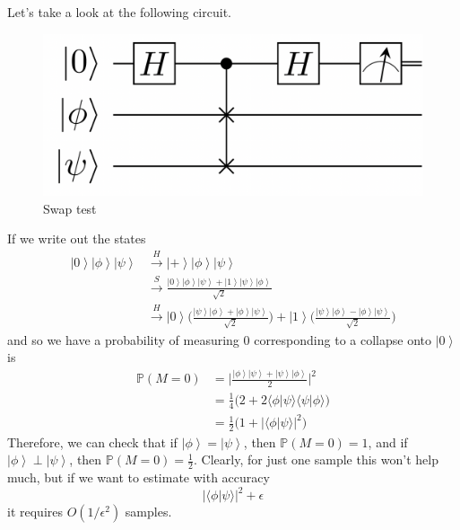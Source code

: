 \documentclass{article}
\newcommand{\ket}[1]{\ensuremath{\left|#1\right\rangle}}
\newcommand{\braket}[2]{\langle #1 | #2 \rangle}
\begin{document}
      Let's take a look at the following circuit. 
      \begin{figure}[H]
        \centering 
        \includegraphics[scale=0.4]{img/swap_test.png}
        \caption{Swap test} 
        \label{fig:swap test}
      \end{figure}
      If we write out the states 
      \begin{align}
        \ket{0} \ket{\phi} \ket{\psi} & \xrightarrow{H} \ket{+} \ket{\phi} \ket{\psi} \\
                                      & \xrightarrow{S} \frac{\ket{0} \ket{\phi} \ket{\psi} + \ket{1} \ket{\psi} \ket{\phi}}{\sqrt{2}} \\ 
                                      & \xrightarrow{H} \ket{0} \bigg( \frac{\ket{\psi} \ket{\phi} + \ket{\phi} \ket{\psi}}{\sqrt{2}} \bigg) + \ket{1} \bigg( \frac{\ket{\psi} \ket{\phi} - \ket{\phi} \ket{\psi}}{\sqrt{2}} \bigg) 
      \end{align}
      and so we have a probability of measuring $0$ corresponding to a collapse onto $\ket{0}$ is 
      \begin{align}
        \mathbb{P}(M = 0) & = \bigg| \frac{\ket{\phi} \ket{\psi} + \ket{\psi} \ket{\phi}}{2} \bigg|^2  \\
                          & = \frac{1}{4} \big( 2 + 2 \braket{\phi}{\psi} \braket{\psi}{\phi} \big) \\
                          & = \frac{1}{2} \big( 1 + |\braket{\phi}{\psi}|^2 \big)
      \end{align}
      Therefore, we can check that if $\ket{\phi} = \ket{\psi}$, then $\mathbb{P}(M = 0) = 1$, and if $\ket{\phi} \perp \ket{\psi}$, then $\mathbb{P}(M = 0) = \frac{1}{2}$. Clearly, for just one sample this won't help much, but if we want to estimate with accuracy
      \begin{equation}
        | \braket{\phi}{\psi} |^2 + \epsilon  
      \end{equation}
      it requires $O(1/\epsilon^2)$ samples. 
\end{document}
